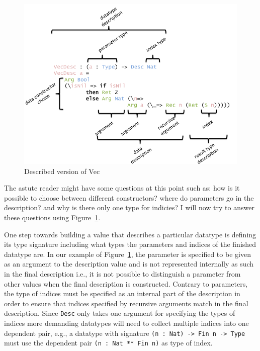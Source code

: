 \documentclass{ituthesis}
\begin{document}
\begin{figure}[ht]
\begin{center}
    \includegraphics[scale=0.5]{Figures/VectorDescription.png}
\end{center}
\caption{Described version of Vec}
\label{fig:descvec}
\end{figure}

The astute reader might have some questions at this point such as: how is it possible to choose between different constructors? where do parameters go in the description? and why is there only one type for indicies?
I will now try to answer these questions using Figure~\ref{fig:descvec}.

One step towards building a value that describes a particular datatype is defining its type signature
including what types the parameters and indices of the finished datatype are. In our example of Figure~\ref{fig:descvec},
the parameter is specified to be given as an argument to the description value and is not represented internally as such in the final description i.e., it is not possible
to distinguish a parameter from other values when the final description is constructed.
Contrary to parameters, the type of indices must be specified as an internal part of the description in order to ensure that indices specified by recursive arguments match in the final description.
Since \texttt{Desc} only takes one argument for specifying the types of indices more demanding datatypes will need to collect multiple indices into one dependent pair, e.g.,
a datatype with signature \texttt{(n : Nat) -> Fin n -> Type} must use the dependent pair \texttt{(n : Nat ** Fin n)} as type of index.
\end{document}
